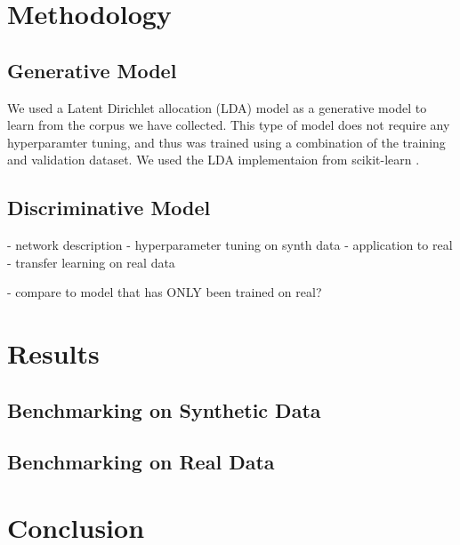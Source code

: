 \documentclass[11pt]{article}
\begin{document}
\section{Methodology}

\subsection{Generative Model}
We used a Latent Dirichlet allocation (LDA) model as a generative model to learn from the corpus we have collected. This type of model does not require any hyperparamter tuning, and thus was trained using a combination of the training and validation dataset. We used the LDA implementaion from scikit-learn \cite{sklearn}. 


\subsection{Discriminative Model}
- network description
- hyperparameter tuning on synth data
- application to real
- transfer learning on real data

- compare to model that has ONLY been trained on real?

\section{Results}
\subsection{Benchmarking on Synthetic Data}

\begin{center}
	
%	
\end{center}


\subsection{Benchmarking on Real Data}

\section{Conclusion}
\begin{adjustbox}{width=\columnwidth,center}

\end{adjustbox}
\end{document}
